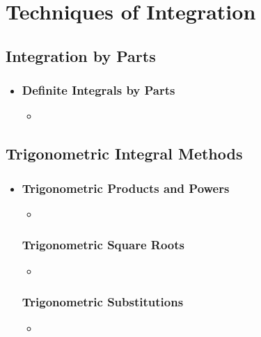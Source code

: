 \chapter{Techniques of Integration}

\section{Integration by Parts}
\begin{itemize}
  \item []
  
  \subsection{Definite Integrals by Parts}
  \begin{itemize}
    \item 
  \end{itemize}
  
\end{itemize}

\section{Trigonometric Integral Methods}
\begin{itemize}
  \item []
  
  \subsection{Trigonometric Products and Powers}
  \begin{itemize}
    \item 
  \end{itemize}

  \subsection{Trigonometric Square Roots}
  \begin{itemize}
    \item 
  \end{itemize}

  \subsection{Trigonometric Substitutions}
  \begin{itemize}
    \item 
  \end{itemize}
  
\end{itemize}

